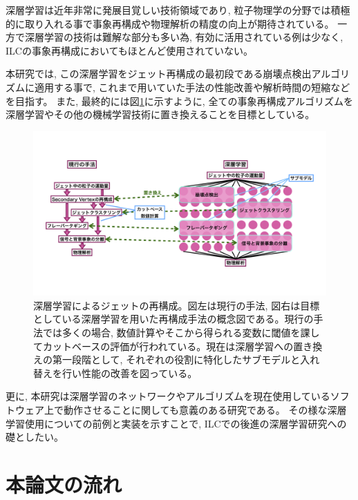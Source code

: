 深層学習は近年非常に発展目覚しい技術領域であり, 粒子物理学の分野では積極的に取り入れる事で事象再構成や物理解析の精度の向上が期待されている。
一方で深層学習の技術は難解な部分も多い為, 有効に活用されている例は少なく, ILCの事象再構成においてもほとんど使用されていない。

本研究では, この深層学習をジェット再構成の最初段である崩壊点検出アルゴリズムに適用する事で, これまで用いていた手法の性能改善や解析時間の短縮などを目指す。
また, 最終的には図\ref{7JetReconstructionwithDeepLearning}に示すように, 全ての事象再構成アルゴリズムを深層学習やその他の機械学習技術に置き換えることを目標としている。

\begin{figure}[htbp]
 \centering
 \includegraphics[trim = 0 100 0 50, width=1.0\textwidth, clip]{Figure/1Introduction/7JetReconstructionwithDeepLearning.png}
 \caption[深層学習によるジェットの再構成]{深層学習によるジェットの再構成。図左は現行の手法, 図右は目標としている深層学習を用いた再構成手法の概念図である。現行の手法では多くの場合, 数値計算やそこから得られる変数に閾値を課してカットベースの評価が行われている。現在は深層学習への置き換えの第一段階として, それぞれの役割に特化したサブモデルと入れ替えを行い性能の改善を図っている。}
 \label{7JetReconstructionwithDeepLearning}
\end{figure}

更に, 本研究は深層学習のネットワークやアルゴリズムを現在使用しているソフトウェア上で動作させることに関しても意義のある研究である。
その様な深層学習使用についての前例と実装を示すことで, ILCでの後進の深層学習研究への礎としたい。


\section{本論文の流れ} \label{Intro:Flow}

